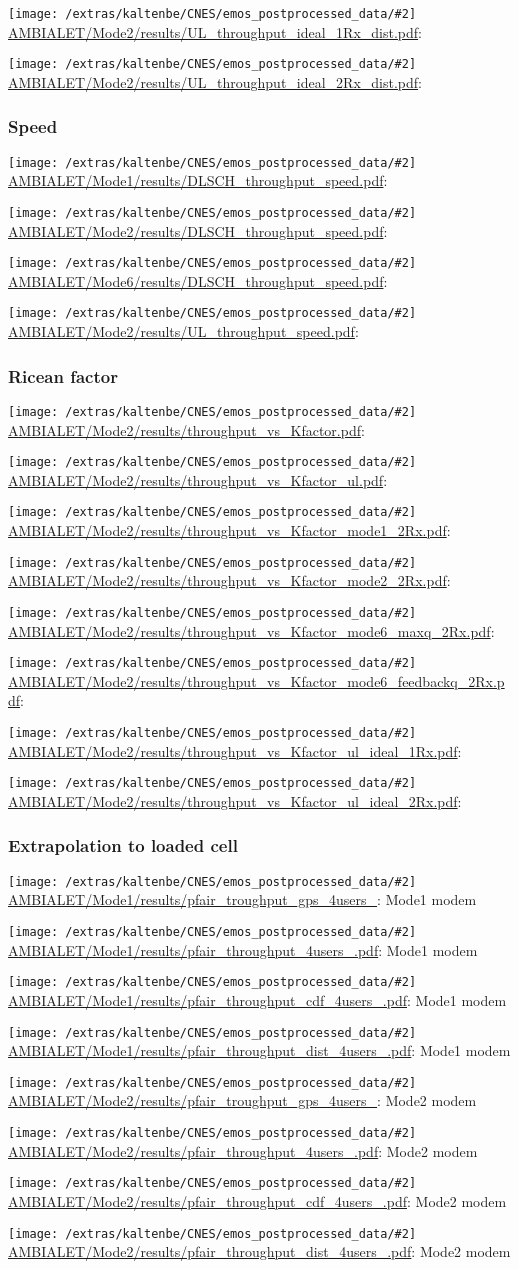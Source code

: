 \documentclass[a4paper,10pt]{article}
\newcommand{\printfile}[2][]{
 \begin{minipage}{8cm}
  \centering
  \texttt{[image: /extras/kaltenbe/CNES/emos\_postprocessed\_data/\#2]}
  \url{#2}: #1

 \end{minipage}
}
\begin{document}
\printfile{AMBIALET/Mode2/results/UL_throughput_ideal_1Rx_dist.pdf}
\printfile{AMBIALET/Mode2/results/UL_throughput_ideal_2Rx_dist.pdf}

\subsubsection{Speed}

\printfile{AMBIALET/Mode1/results/DLSCH_throughput_speed.pdf}
\printfile{AMBIALET/Mode2/results/DLSCH_throughput_speed.pdf}

\printfile{AMBIALET/Mode6/results/DLSCH_throughput_speed.pdf}
\printfile{AMBIALET/Mode2/results/UL_throughput_speed.pdf}

\subsubsection{Ricean factor}

\printfile{AMBIALET/Mode2/results/throughput_vs_Kfactor.pdf}
\printfile{AMBIALET/Mode2/results/throughput_vs_Kfactor_ul.pdf}

\printfile{AMBIALET/Mode2/results/throughput_vs_Kfactor_mode1_2Rx.pdf}
\printfile{AMBIALET/Mode2/results/throughput_vs_Kfactor_mode2_2Rx.pdf}

\printfile{AMBIALET/Mode2/results/throughput_vs_Kfactor_mode6_maxq_2Rx.pdf}
\printfile{AMBIALET/Mode2/results/throughput_vs_Kfactor_mode6_feedbackq_2Rx.pdf}

\printfile{AMBIALET/Mode2/results/throughput_vs_Kfactor_ul_ideal_1Rx.pdf}
\printfile{AMBIALET/Mode2/results/throughput_vs_Kfactor_ul_ideal_2Rx.pdf}

\subsubsection{Extrapolation to loaded cell}

\printfile[Mode1 modem]{AMBIALET/Mode1/results/pfair_troughput_gps_4users_}
\printfile[Mode1 modem]{AMBIALET/Mode1/results/pfair_throughput_4users_.pdf}

\printfile[Mode1 modem]{AMBIALET/Mode1/results/pfair_throughput_cdf_4users_.pdf}
\printfile[Mode1 modem]{AMBIALET/Mode1/results/pfair_throughput_dist_4users_.pdf}

\printfile[Mode2 modem]{AMBIALET/Mode2/results/pfair_troughput_gps_4users_}
\printfile[Mode2 modem]{AMBIALET/Mode2/results/pfair_throughput_4users_.pdf}

\printfile[Mode2 modem]{AMBIALET/Mode2/results/pfair_throughput_cdf_4users_.pdf}
\printfile[Mode2 modem]{AMBIALET/Mode2/results/pfair_throughput_dist_4users_.pdf}
\end{document}

